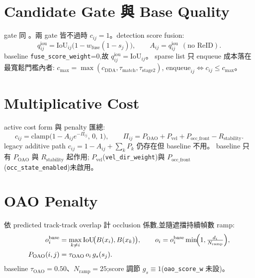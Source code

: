 \section{Candidate Gate 與 Base Quality}\label{sec:as-gate}
gate 同 。兩 gate 皆不過時 \(c_{ij}=1\)。detection score fusion:
\begin{equation}\label{eq:as-q}
  q^{\mathrm{iou}}_{ij}=\mathrm{IoU}_{ij}\bigl(1-w_{\mathrm{fuse}}(1-s_j)\bigr),
  \qquad A_{ij}=q^{\mathrm{iou}}_{ij}\ \ (\text{no ReID}).
\end{equation}
baseline \texttt{fuse\_score\_weight}=0,故 \(q^{\mathrm{iou}}_{ij}=\mathrm{IoU}_{ij}\)。
sparse list 只 enqueue 成本落在最寬鬆門檻內者:
\(c_{\max}=\max(c_{\mathrm{DDA}},\tau_{\mathrm{match}},\tau_{\mathrm{stage2}})\),
\(\mathrm{enqueue}_{ij}\iff c_{ij}\le c_{\max}\)。

\section{Multiplicative Cost}\label{sec:as-cost}
active cost form 與 penalty 匯總:
\begin{equation}\label{eq:as-cost}
  c_{ij}=\mathrm{clamp}\!\bigl(1-A_{ij}e^{-\Pi_{ij}},\,0,\,1\bigr),\qquad
  \Pi_{ij}=P_{\mathrm{OAO}}+P_{\mathrm{vel}}+P_{\mathrm{occ\_front}}-R_{\mathrm{stability}}.
\end{equation}
legacy additive path \(c_{ij}=1-A_{ij}+\sum_k P_k\) 仍存在但 baseline 不用。
baseline 只有 \(P_{\mathrm{OAO}}\) 與 \(R_{\mathrm{stability}}\) 起作用;
\(P_{\mathrm{vel}}\)(\texttt{vel\_dir\_weight})與 \(P_{\mathrm{occ\_front}}\)
(\texttt{occ\_state\_enabled})未啟用。

\section{OAO Penalty}\label{sec:as-oao}
依 predicted track-track overlap 計 occlusion 係數,並隨遮擋持續幀數 ramp:
\begin{equation}\label{eq:as-oao}
\begin{aligned}
  o^{\mathrm{base}}_i&=\max_{k\ne i}\mathrm{IoU}\!\bigl(B(x_i),B(x_k)\bigr),\qquad
  o_i=o^{\mathrm{base}}_i\min\!\Bigl(1,\tfrac{d_i}{N_{\mathrm{ramp}}}\Bigr),\\
  P_{\mathrm{OAO}}(i,j)&=\tau_{\mathrm{OAO}}\,o_i\,g_s(s_j).
\end{aligned}
\end{equation}
baseline \(\tau_{\mathrm{OAO}}=0.50\)、\(N_{\mathrm{ramp}}=25\);score 調節
\(g_s\equiv1\)(\texttt{oao\_score\_w} 未設)。

